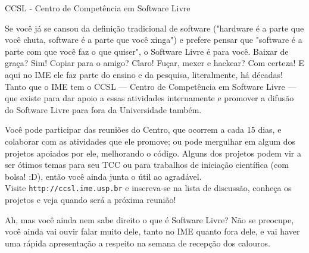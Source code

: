 \begin{secao}{CCSL - Centro de Competência em Software Livre}

Se você já se cansou da definição tradicional de software ("hardware é a parte
que você chuta, software é a parte que você xinga") e prefere pensar que
"software é a parte com que você faz o que quiser", o Software Livre é para você. 
Baixar de graça? Sim! Copiar para o amigo? Claro! Fuçar, mexer e hackear? Com
 certeza! E aqui no IME ele faz parte do ensino e da pesquisa, literalmente, há
 décadas! Tanto que o IME tem o CCSL --- Centro de Competência em Software Livre
 --- que existe para dar apoio a essas atividades internamente e promover a
 difusão do Software Livre para fora da Universidade também.

Você pode participar das reuniões do Centro, que ocorrem a cada 15 dias, e
 colaborar com as atividades que ele promove; ou pode mergulhar em algum dos
 projetos apoiados por ele, melhorando o código. Alguns dos projetos podem vir a
 ser ótimos temas para seu TCC ou para trabalhos de iniciação científica (com
 bolsa! :D), então você ainda junta o útil ao agradável.\\
Visite {\tt http://ccsl.ime.usp.br} e inscreva-se na lista de discussão,
 conheça os projetos e veja quando será a próxima reunião!

Ah, mas você ainda nem sabe direito o que é Software Livre? Não se preocupe,
 você ainda vai ouvir falar muito dele, tanto no IME quanto fora dele, e vai
 haver uma rápida apresentação a respeito na semana de recepção dos calouros.

\end{secao}
